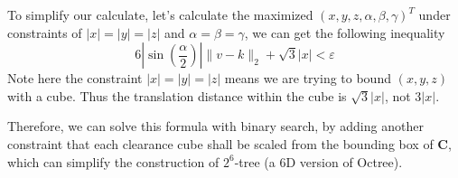\documentclass[fleqn,reqno]{amsart}
\theoremstyle{definition}
\begin{document}
To simplify our calculate, let's calculate the maximized
$(x,y,z,\alpha,\beta,\gamma)^T$ under constraints of $|x|=|y|=|z|$ and
$\alpha=\beta=\gamma$, we can get the following inequality
\[
6|\sin(\frac{\alpha}{2})|\|v-k\|_2+\sqrt{3}|x|<\varepsilon
\]
Note here the constraint $|x|=|y|=|z|$ means we are trying to bound $(x,y,z)$
with a cube. Thus the translation distance within the cube is $\sqrt{3}|x|$,
not $3|x|$.

Therefore, we can solve this formula with binary search, by adding another
constraint that each clearance cube shall be scaled from the bounding box
of $\mathbf{C}$, which can simplify the construction of $2^6$-tree (a 6D
version of Octree).
\end{document}
